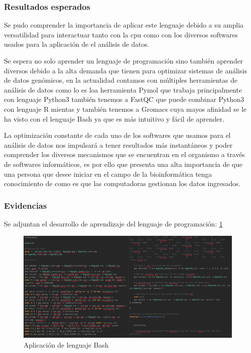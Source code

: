 \documentclass[a4paper, 12pt]{article}
\begin{document}
        \subsubsection{Resultados esperados}
        Se pudo comprender la importancia de aplicar este lenguaje debido a su amplia versatilidad para interactuar tanto con la cpu como con los diversos softwares usados para la aplicación de el análisis de datos.

        Se espera no solo aprender un lenguaje de programación sino también aprender diversos debido a la alta demanda que tienen para optimizar sistemas de análisis de datos genómicos, en la actualidad contamos con múltiples herramientas de análisis de datos como lo es loa herramienta Pymol que trabaja principalmente con lenguaje Python3 también tenemos a FastQC que puede combinar Python3 con lenguaje R mientas y también tenemos a Gromacs cuya mayos afinidad se le ha visto con el lenguaje Bash ya que es más intuitivo y fácil de aprender. 

        La optimización constante de cada uno de los softwares que usamos para el análisis de datos nos impulsará a tener resultados más instantáneos y poder comprender los diversos mecanismos que se encuentran en el organismo a través de softwares informáticos, es por ello que presenta una alta importancia de que una persona que desee iniciar en el campo de la bioinformática tenga conocimiento de como es que las computadoras gestionan los datos ingresados. 

        \subsubsection{Evidencias}
        Se adjuntan el desarrollo de aprendizaje del lenguaje de programación: \ref{Fig:BashScript}

        \begin{figure}[H]
            \centering
            \includegraphics[width=14cm]{img/scrip.png}
            \caption{Aplicación de lenguaje Bash}
            \label{Fig:BashScript}
        \end{figure}
        
\end{document}
